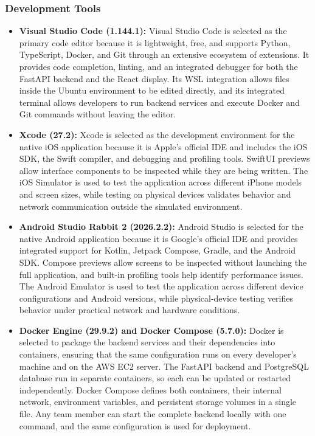 \documentclass[conference]{IEEEtran}
\begin{document}
\subsubsection{Development Tools}
\begin{itemize}
    \item \textbf{Visual Studio Code (1.144.1):} Visual Studio Code is selected as the primary code editor because it is lightweight, free, and supports Python, TypeScript, Docker, and Git through an extensive ecosystem of extensions. It provides code completion, linting, and an integrated debugger for both the FastAPI backend and the React display. Its WSL integration allows files inside the Ubuntu environment to be edited directly, and its integrated terminal allows developers to run backend services and execute Docker and Git commands without leaving the editor.
    \item \textbf{Xcode (27.2):} Xcode is selected as the development environment for the native iOS application because it is Apple's official IDE and includes the iOS SDK, the Swift compiler, and debugging and profiling tools. SwiftUI previews allow interface components to be inspected while they are being written. The iOS Simulator is used to test the application across different iPhone models and screen sizes, while testing on physical devices validates behavior and network communication outside the simulated environment.
    \item \textbf{Android Studio Rabbit 2 (2026.2.2):} Android Studio is selected for the native Android application because it is Google's official IDE and provides integrated support for Kotlin, Jetpack Compose, Gradle, and the Android SDK. Compose previews allow screens to be inspected without launching the full application, and built-in profiling tools help identify performance issues. The Android Emulator is used to test the application across different device configurations and Android versions, while physical-device testing verifies behavior under practical network and hardware conditions.
    \item \textbf{Docker Engine (29.9.2) and Docker Compose (5.7.0):} Docker is selected to package the backend services and their dependencies into containers, ensuring that the same configuration runs on every developer's machine and on the AWS EC2 server. The FastAPI backend and PostgreSQL database run in separate containers, so each can be updated or restarted independently. Docker Compose defines both containers, their internal network, environment variables, and persistent storage volumes in a single file. Any team member can start the complete backend locally with one command, and the same configuration is used for deployment.

\end{itemize}
\end{document}
